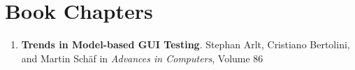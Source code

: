 \section{\sc Book Chapters}

\begin{enumerate} \setcounter{enumi}{\value{saveenum}}

  \item \textbf{Trends in Model-based GUI Testing}. Stephan Arlt, Cristiano
  Bertolini, and Martin Sch\"af in \emph{Advances in Computers}, Volume 86
  
 \setcounter{saveenum}{\value{enumi}} 
\end{enumerate}

\iffalse
\section{\sc Drafts and Technical Reports}

\begin{enumerate}\setcounter{enumi}{\value{saveenum}}
 \item \textbf{Towards Bounded Infeasible Code Detection}. J�rgen Christ, Jochen
 Hoenicke, and Martin Sch\"af, arXiv:1205.6527, May 2012 
 
 \item \textbf{Grey-box GUI Testing: Efficient Generation of Event Sequences}.
 Stephan Arlt, Cristiano Bertolini, Ishan Banerjee, Atif Memon, and Martin
 Sch\"af,\\ arXiv:1205.4928, May 2012 
 
 \item \textbf{Slicing Abstraction using Path Formulas}. Evren Ermis, Jochen
 Hoenicke, Andreas Podelski, and Martin Sch{\"a}f. UNU Technical Report Nr.
 449, June 2011
  
 \setcounter{saveenum}{\value{enumi}} 
\end{enumerate}
\fi
